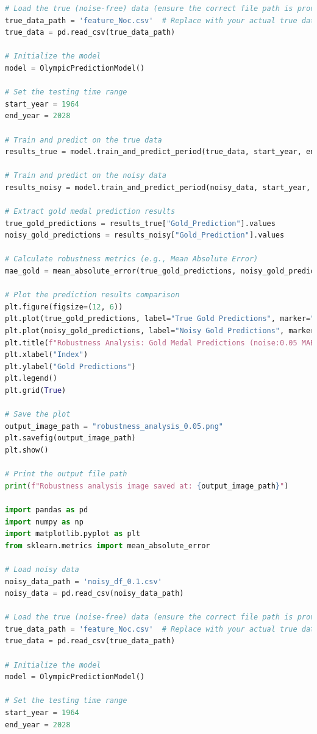 \documentclass[12pt]{article}
\begin{document}
\begin{lstlisting}[language=Python, style=mystyle, caption=model.ipynb]
# Load the true (noise-free) data (ensure the correct file path is provided)
true_data_path = 'feature_Noc.csv'  # Replace with your actual true data path
true_data = pd.read_csv(true_data_path)

# Initialize the model
model = OlympicPredictionModel()

# Set the testing time range
start_year = 1964
end_year = 2028

# Train and predict on the true data
results_true = model.train_and_predict_period(true_data, start_year, end_year)

# Train and predict on the noisy data
results_noisy = model.train_and_predict_period(noisy_data, start_year, end_year)

# Extract gold medal prediction results
true_gold_predictions = results_true["Gold_Prediction"].values
noisy_gold_predictions = results_noisy["Gold_Prediction"].values

# Calculate robustness metrics (e.g., Mean Absolute Error)
mae_gold = mean_absolute_error(true_gold_predictions, noisy_gold_predictions)

# Plot the prediction results comparison
plt.figure(figsize=(12, 6))
plt.plot(true_gold_predictions, label="True Gold Predictions", marker="o")
plt.plot(noisy_gold_predictions, label="Noisy Gold Predictions", marker="x", linestyle="--")
plt.title(f"Robustness Analysis: Gold Medal Predictions (noise:0.05 MAE: {mae_gold:.2f})")
plt.xlabel("Index")
plt.ylabel("Gold Predictions")
plt.legend()
plt.grid(True)

# Save the plot
output_image_path = "robustness_analysis_0.05.png"
plt.savefig(output_image_path)
plt.show()

# Print the output file path
print(f"Robustness analysis image saved at: {output_image_path}")

import pandas as pd
import numpy as np
import matplotlib.pyplot as plt
from sklearn.metrics import mean_absolute_error

# Load noisy data
noisy_data_path = 'noisy_df_0.1.csv'
noisy_data = pd.read_csv(noisy_data_path)

# Load the true (noise-free) data (ensure the correct file path is provided)
true_data_path = 'feature_Noc.csv'  # Replace with your actual true data path
true_data = pd.read_csv(true_data_path)

# Initialize the model
model = OlympicPredictionModel()

# Set the testing time range
start_year = 1964
end_year = 2028


\end{lstlisting}
\end{document}
